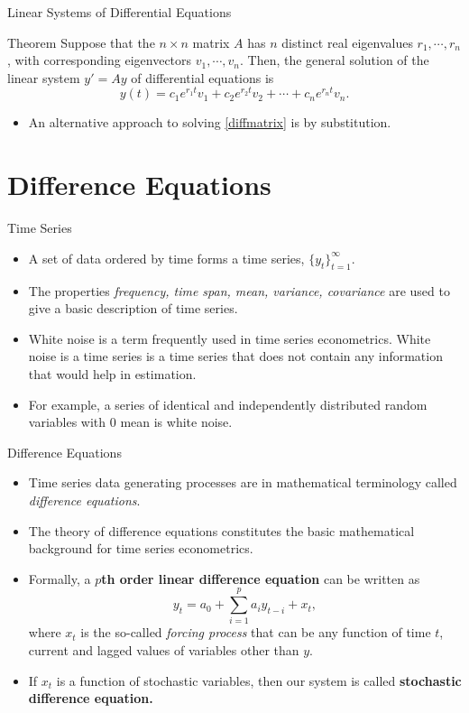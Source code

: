 \documentclass{beamer}
\begin{document}
\begin{frame}{Linear Systems of Differential Equations}
\begin{block}{Theorem}
   Suppose that the $n\times n$ matrix $A$ has $n$ distinct real eigenvalues $r_1,\cdots, r_n$, with corresponding eigenvectors $v_1,\cdots, v_n$. Then, the general solution of the linear system  $y'=Ay$ of differential equations is
   \[y(t)=c_1e^{r_1t}v_1+c_2e^{r_2t}v_2+\cdots+c_ne^{r_nt}v_n.
   \]
   
    \end{block}
\begin{itemize}
    \item An alternative approach to solving \eqref{diffmatrix} is by substitution. 
\end{itemize}
\end{frame}


\section{Difference Equations}
\begin{frame}{Time Series}
    \begin{itemize}
        \item A set of data ordered by time forms a time series, $\{y_t\}_{t=1}^\infty$. 
        \item The properties \textit{frequency, time span, mean, variance, covariance} are used to give a basic description of time series. 
        \item White noise is a term frequently used in time series econometrics. White noise is a time series is a time series that does not contain any information that would help in estimation.
        \item For example,  a series of identical and independently distributed random variables with 0 mean is white noise. 
    \end{itemize}
\end{frame}

\begin{frame}{Difference Equations}
\begin{itemize}
    \item Time series data generating processes are in mathematical terminology called \textit{difference equations}. \item The theory of difference equations constitutes the basic mathematical background for time series econometrics.
    \item Formally, a \textbf{$p$th order linear difference equation} can be written as 
    \[y_t=a_0+\sum_{i=1}^pa_iy_{t-i}+x_t,
    \]
    where $x_t$ is the so-called \textit{forcing process} that can be any function of time $t$, current and lagged values of variables other than $y$.
    \item If $x_t$ is a  function of stochastic variables, then our system is called \textbf{stochastic difference equation.} 
\end{itemize}
\end{frame}
\end{document}
